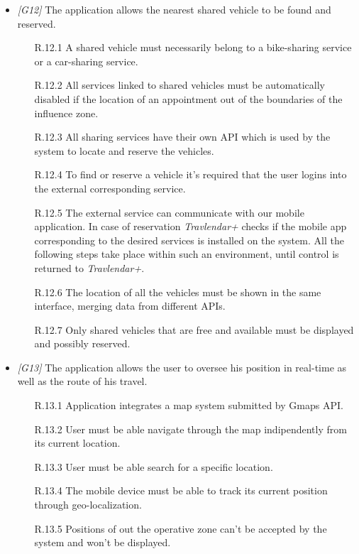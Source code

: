 \begin{itemize}
	\item \textit{[G12]} The application allows the nearest shared vehicle to be found and reserved.
		\begin{itemize}
			\item [R.12.1] A shared vehicle must necessarily belong to a bike-sharing service or a car-sharing service.
			\item [R.12.2] All services linked to shared vehicles must be automatically disabled if the location of an appointment out of the boundaries of the influence zone.
			\item [R.12.3] All sharing services have their own API which is used by the system to locate and reserve the vehicles.
			\item [R.12.4] To find or reserve a vehicle it's required that the user logins into the external corresponding service.
			\item [R.12.5] The external service can communicate with our mobile application. In case of reservation \textit{Travlendar+} checks if the mobile app corresponding to the desired services is installed on the system. All the following steps take place within such an environment, until control is returned to \textit{Travlendar+}.
			\item [R.12.6] The location of all the vehicles must be shown in the same interface, merging data from different APIs.
			\item[R.12.7] Only shared vehicles that are free and available must be displayed and possibly reserved.
		\end{itemize}


	\item \textit{[G13]} The application allows the user to oversee his position in real-time as well as the route of his travel.
		\begin{itemize}
			\item [R.13.1] Application integrates a map system submitted by Gmaps API.
			\item [R.13.2] User must be able navigate through the map indipendently from its current location.
			\item [R.13.3] User must be able search for a specific location.
			\item [R.13.4] The mobile device must be able to track its current position through geo-localization.
			\item [R.13.5] Positions of out the operative zone can't be accepted by the system and won't be displayed.
		\end{itemize}



\end{itemize}

